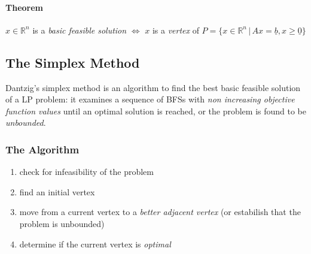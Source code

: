 \documentclass{article}
\begin{document}
				\paragraph{Theorem}
					$x \in \mathbb{R}^n$ is a \textit{basic feasible solution} $\Leftrightarrow$ $x$ is a \textit{vertex} of $P = \{x \in \mathbb{R}^n \,\vert\, Ax = \underline{b}, x \geq \underline{0}\}$

		\subsection{The Simplex Method}
			Dantzig's simplex method is an algorithm to find the best basic feasible solution of a LP problem: it examines a sequence of BFSs with \textit{non increasing objective function values} until an optimal solution is reached, or the problem is found to be \textit{unbounded}.

			\subsubsection{The Algorithm}
				\begin{enumerate}
					\item check for infeasibility of the problem
					\item find an initial vertex
					\item move from a current vertex to a \textit{better adjacent vertex} (or estabilish that the problem is unbounded)
					\item determine if the current vertex is \textit{optimal}
				\end{enumerate}
\end{document}
